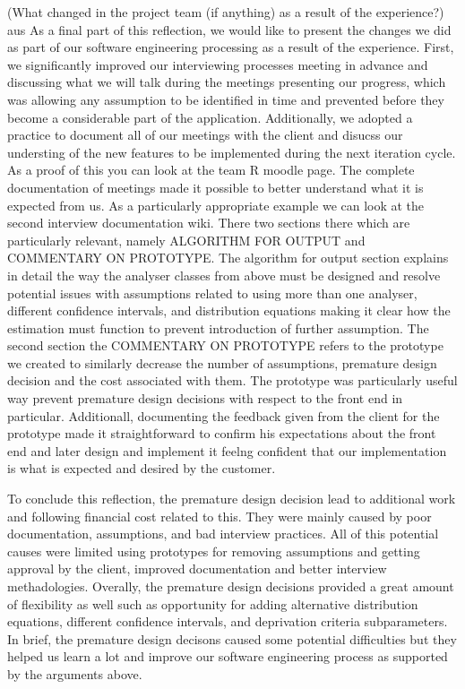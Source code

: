 \documentclass{l3proj}
\begin{document}
(What changed in the project team (if anything) as a result of the experience?)
aus
As a final part of this reflection, we would like to present the changes we did as part of our software engineering processing as a result of the experience. First, we significantly improved our interviewing processes meeting in advance and discussing what we will talk during the meetings presenting our progress, which was allowing any assumption to be identified in time and prevented before they become a considerable part of the application. Additionally, we adopted a practice to document all of our meetings with the client and disucss our understing of the new features to be implemented during the next iteration cycle. As a proof of this you can look at the team R moodle page. The complete documentation of meetings made it  possible to better understand what it is expected from us. As a particularly appropriate example we can look at the second interview documentation wiki. There two sections there which are particularly relevant, namely ALGORITHM FOR OUTPUT and COMMENTARY ON PROTOTYPE. The algorithm for output section explains in detail the way the analyser classes from above must be designed and resolve potential issues with assumptions related to using more than one analyser, different confidence intervals, and distribution equations making it clear how the estimation must function to prevent introduction of further assumption. The second section the COMMENTARY ON PROTOTYPE refers to the prototype we created to similarly decrease the number of assumptions, premature design decision and the cost associated with them. The prototype was particularly useful way prevent premature design decisions with respect to the front end in particular. Additionall, documenting the feedback given from the client for the prototype made it straightforward to confirm his expectations about the front end and later design and implement it feelng confident that our implementation is what is expected and desired by the customer.

To conclude this reflection, the premature design decision lead to additional work and following financial cost related to this. They were mainly caused by poor documentation, assumptions, and bad interview practices. All of this potential causes were limited using prototypes for removing assumptions and getting approval by the client, improved documentation and better interview methadologies. Overally, the premature design decisions provided a great amount of flexibility as well such as opportunity for adding alternative distribution equations, different confidence intervals, and deprivation criteria subparameters. In brief, the premature design decisons caused some potential difficulties but they helped us learn a lot and improve our software engineering process as supported by the arguments above.
 
\end{document}
